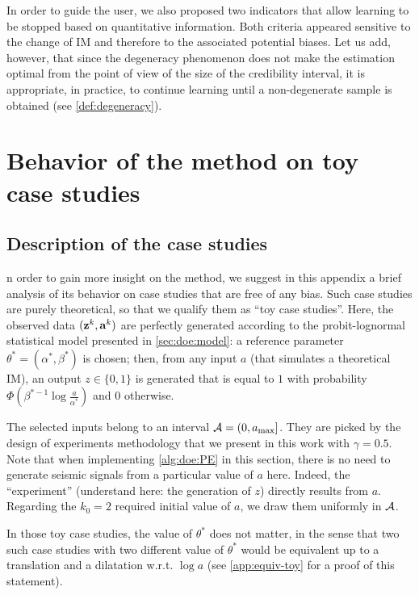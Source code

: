 In order to guide the user, we also proposed two indicators that allow learning to be stopped based on quantitative information. Both criteria appeared sensitive to the change of IM and therefore to the associated potential biases. Let us add, however, that since the degeneracy phenomenon does not make the estimation optimal from the point of view of the size of the credibility interval, it is appropriate, in practice, to continue learning until a non-degenerate sample is obtained (see \cref{def:degeneracy}).



\section{Behavior of the method on toy case studies}\label{app:doe:toycases}

    \subsection{Description of the case studies}
    

    n order to gain more insight on the method, we suggest in this appendix a brief analysis of its behavior on case studies that are free of any bias. 
    Such case studies are purely theoretical, so that we qualify them as ``toy case studies''. Here, the observed data $(\mathbf{z}^k,\mathbf{a}^k)$ are perfectly generated according to the probit-lognormal statistical model presented in \cref{sec:doe:model}:
    a reference parameter $\theta^\ast=(\alpha^\ast,\beta^\ast)$ is chosen; then, from any input $a$ (that simulates a theoretical IM), an output $z\in\{0,1\}$ is generated that is equal to $1$ with probability $\Phi\left(\beta^{\ast -1}\log\frac{a}{\alpha^{\ast}}\right)$ and $0$ otherwise.
    
    The selected inputs belong to an interval $\mathcal{A}=(0,a_{\text{max}}]$.
    They are picked by the {design} of experiments methodology that we present in this work with $\gamma=0.5$. Note that when implementing \cref{alg:doe:PE} in this section, there is no need to generate seismic signals from a particular value of $a$ here. Indeed, the ``experiment'' (understand here: the generation of $z$) directly results from $a$.
    Regarding the $k_0=2$ required initial value of $a$, we draw them uniformly in $\mathcal{A}$.
    
    In those toy case studies, the value of $\theta^\ast$ does not matter, in the sense that two such case studies with two different value of $\theta^\ast$ would be equivalent up to a translation and a dilatation w.r.t. $\log a$ (see \cref{app:equiv-toy} for a proof of this statement).
    
